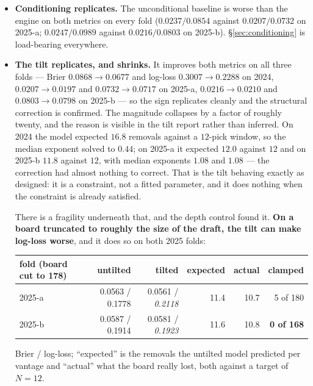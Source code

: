 \documentclass[10pt,a4paper]{article}
\theoremstyle{plain}
\theoremstyle{definition}
\theoremstyle{remark}
\begin{document}
\begin{itemize}
\item \textbf{Conditioning replicates.} The unconditional baseline is worse than the
engine on both metrics on every fold ($0.0237 / 0.0854$ against $0.0207 / 0.0732$ on
2025-a; $0.0247 / 0.0989$ against $0.0216 / 0.0803$ on 2025-b). \S\ref{sec:conditioning}
is load-bearing everywhere.

\item \textbf{The tilt replicates, and shrinks.} It improves both metrics on all three
folds --- Brier $0.0868 \to 0.0677$ and log-loss $0.3007 \to 0.2288$ on 2024, $0.0207 \to
0.0197$ and $0.0732 \to 0.0717$ on 2025-a, $0.0216 \to 0.0210$ and $0.0803 \to 0.0798$ on
2025-b --- so the sign replicates cleanly and the structural correction is confirmed. The
magnitude collapses by a factor of roughly twenty, and the reason is visible in the tilt
report rather than inferred. On 2024 the model expected $16.8$ removals against a
$12$-pick window, so the median exponent solved to $0.44$; on 2025-a it expected $12.0$
against $12$ and on 2025-b $11.8$ against $12$, with median exponents $1.08$ and $1.08$
--- the correction had almost nothing to correct. That is the tilt behaving exactly as
designed: it is a constraint, not a fitted parameter, and it does nothing when the
constraint is already satisfied.

There is a fragility underneath that, and the depth control found it. \textbf{On a board
truncated to roughly the size of the draft, the tilt can make log-loss worse}, and it does
so on both 2025 folds:

\begin{center}
\small
\begin{tabular}{lrrrrr}
\toprule
fold (board cut to 178) & untilted & tilted & expected & actual & clamped \\
\midrule
2025-a & 0.0563 / 0.1778 & 0.0561 / \emph{0.2118} & 11.4 & 10.7 & 5 of 180 \\
2025-b & 0.0587 / 0.1914 & 0.0581 / \emph{0.1923} & 11.6 & 10.8 & \textbf{0 of 168} \\
\bottomrule
\end{tabular}
\end{center}

Brier / log-loss; ``expected'' is the removals the untilted model predicted per vantage and
``actual'' what the board really lost, both against a target of $N = 12$.


\end{itemize}
\end{document}
